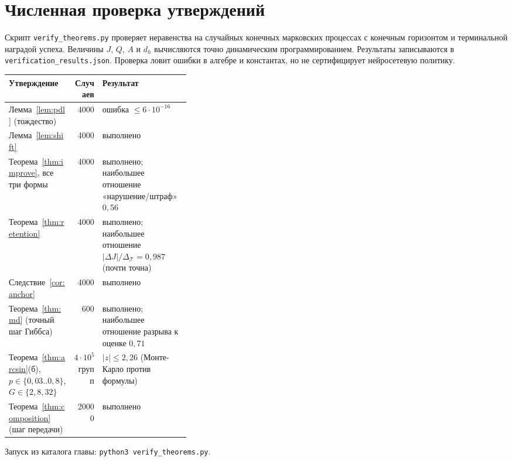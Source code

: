 \documentclass[11pt,a4paper]{article}
\theoremstyle{plain}
\theoremstyle{definition}
\theoremstyle{remark}
\newcommand{\cT}{\mathcal{T}}
\begin{document}
\section{Численная проверка утверждений}\label{app:numerics}

Скрипт \texttt{verify\_theorems.py} проверяет неравенства на случайных конечных марковских процессах с конечным горизонтом и терминальной наградой успеха. Величины $J$, $Q$, $A$ и $d_h$ вычисляются точно динамическим программированием. Результаты записываются в \texttt{verification\_results.json}. Проверка ловит ошибки в алгебре и константах, но не сертифицирует нейросетевую политику.

\begin{center}
\begin{tabularx}{\linewidth}{>{\raggedright}p{0.36\linewidth}r>{\raggedright\arraybackslash}X}
\toprule
Утверждение & Случаев & Результат \\
\midrule
Лемма~\ref{lem:pdl} (тождество) & 4000 & ошибка $\le6\cdot10^{-16}$ \\
Лемма~\ref{lem:shift} & 4000 & выполнено \\
Теорема~\ref{thm:improve}, все три формы & 4000 & выполнено; наибольшее отношение «нарушение/штраф» $0{,}56$ \\
Теорема~\ref{thm:retention} & 4000 & выполнено; наибольшее отношение $|\Delta J|/\Delta_\cT=0{,}987$ (почти точна) \\
Следствие~\ref{cor:anchor} & 4000 & выполнено \\
Теорема~\ref{thm:md} (точный шаг Гиббса) & 600 & выполнено; наибольшее отношение разрыва к оценке $0{,}71$ \\
Теорема~\ref{thm:arcsin}(б), $p\in\{0{,}03..0{,}8\}$, $G\in\{2,8,32\}$ & $4\cdot10^5$ групп & $|z|\le2{,}26$ (Монте-Карло против формулы) \\
Теорема~\ref{thm:composition} (шаг передачи) & 20000 & выполнено \\
\bottomrule
\end{tabularx}
\end{center}

Запуск из каталога главы: \texttt{python3 verify\_theorems.py}.
\end{document}
